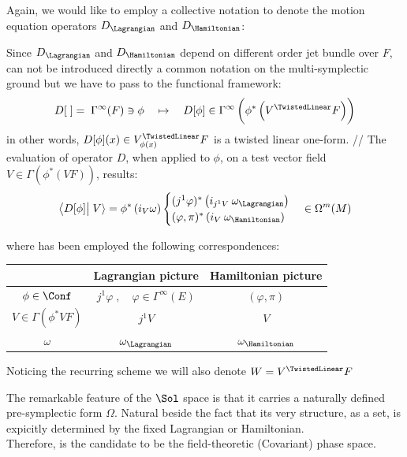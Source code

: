 \documentclass[a4paper,12pt,fleqn]{scrartcl}  %
\begin{document}
Again, we would like to employ a collective notation to denote the motion equation operators $D_\Lagrangian$ and $D_\Hamiltonian$:
\begin{notation}
	Since $D_\Lagrangian$ and $D_\Hamiltonian$ depend on different order jet bundle over $F$, can not be introduced directly a common notation on the multi-symplectic ground but we have to pass to the functional framework:
\begin{displaymath}
	D[\; ] = \; \Gamma^\infty(F) \ni \phi \quad \mapsto \quad D[ \phi ] \in \Gamma^\infty \left( \phi^\ast \left(V^\TwistedLinear F \right)\right)
\end{displaymath}	
in other words, $D[\phi](x) \in V^\TwistedLinear_{\phi(x)}F$ is a twisted linear one-form.
//
	The evaluation of operator $D$, when applied to $\phi$, on a test vector field $V \in \Gamma(\phi^\ast(VF))$, results:
	\begin{displaymath}
		\left\langle D[\phi] \right\vert \left. V \right\rangle =
		\phi^\ast \left( i_V \omega \right) 
		\begin{cases}
			(j^1 \varphi)^\ast \left( i_{j^1V} \: \omega_\Lagrangian \right) \\
			(\varphi, \pi)^\ast \left( i_V \: \omega_\Hamiltonian \right)
		\end{cases}              
        \in \Omega^m(M)
	\end{displaymath}
	
	where has been employed the following correspondences:
	\begin{center}
		\begin{tabular}{|c|c|c|}
			\hline
			 & Lagrangian picture & Hamiltonian picture \\
			\hline
			$\phi \in \Conf$		&	$j^1 \varphi \; , \quad \varphi \in \Gamma^\infty(E)$		&	$(\varphi, \pi)$	\\
			$V \in \Gamma(\phi^\ast V F )$ & $j^1 V$ & $V$ \\
			$\omega$ & $\omega_\Lagrangian$ & $\omega_\Hamiltonian$ \\
			\hline
		\end{tabular}
	\end{center}	
	
	
	Noticing the recurring scheme we will also denote $
		W = V^\TwistedLinear F $
\end{notation}

The remarkable feature of the $\Sol$ space is that it carries a naturally defined pre-symplectic form $\Omega$. Natural beside the fact that its very structure, as a set, is expicitly determined by the fixed Lagrangian or Hamiltonian.\\
Therefore, is the candidate to  be the field-theoretic (Covariant) phase space.
\end{document}

